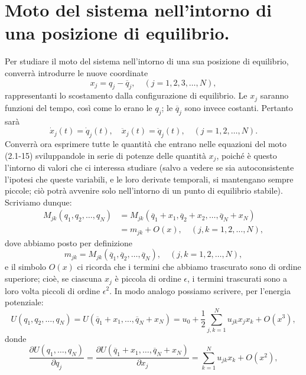\documentclass[11pt, a4paper]{book}
\numberwithin{equation}{section}
\begin{document}
\section{Moto del sistema nell'intorno di una posizione di equilibrio.}

Per studiare il moto del sistema nell'intorno di una sua posizione di equilibrio, converrà introdurre le nuove coordinate
\begin{equation}
x_j = q_j - \overline{q}_j, \quad (j = 1, 2, 3, \dots, N),
\end{equation}
rappresentanti lo scostamento dalla configurazione di equilibrio. Le $x_j$ saranno funzioni del tempo, così come lo erano le $q_j$; le $\overline{q}_j$ sono invece costanti. Pertanto sarà
\begin{equation}
\dot{x}_j(t) = \dot{q}_j(t), \quad \ddot{x}_j(t) = \ddot{q}_j(t), \quad (j = 1, 2, \dots, N).
\end{equation}
Converrà ora esprimere tutte le quantità che entrano nelle equazioni del moto (2.1-15) sviluppandole in serie di potenze delle quantità $x_j$, poiché è questo l'intorno di valori che ci interessa studiare (salvo a vedere se sia autoconsistente l'ipotesi che queste variabili, e le loro derivate temporali, si mantengano sempre piccole; ciò potrà avvenire solo nell'intorno di un punto di equilibrio stabile). Scriviamo dunque:
\begin{align}
M_{jk}(q_1, q_2, \dots, q_N) &= M_{jk}(\overline{q}_1 + x_1, \overline{q}_2 + x_2, \dots, \overline{q}_N + x_N) \nonumber \\
&= m_{jk} + O(x), \quad (j, k = 1, 2, \dots, N),
\end{align}
dove abbiamo posto per definizione
\begin{equation}
m_{jk} = M_{jk}(\overline{q}_1, \overline{q}_2, \dots, \overline{q}_N), \quad (j, k = 1, 2, \dots, N),
\end{equation}
e il simbolo $O(x)$ ci ricorda che i termini che abbiamo trascurato sono di ordine superiore; cioè, se ciascuna $x_j$ è piccola di ordine $\epsilon$, i termini trascurati sono a loro volta piccoli di ordine $\epsilon^2$. In modo analogo possiamo scrivere, per l'energia potenziale:
\begin{equation}
U(q_1, q_2, \dots, q_N) = U(\overline{q}_1 + x_1, \dots, \overline{q}_N + x_N) = u_0 + \frac{1}{2} \sum_{j,k=1}^{N} u_{jk} x_j x_k + O(x^3),
\end{equation}
donde
\begin{equation}
\frac{\partial U(q_1, \dots, q_N)}{\partial q_j} = \frac{\partial U(\overline{q}_1 + x_1, \dots, \overline{q}_N + x_N)}{\partial x_j} = \sum_{k=1}^{N} u_{jk} x_k + O(x^2),
\end{equation}
\end{document}

